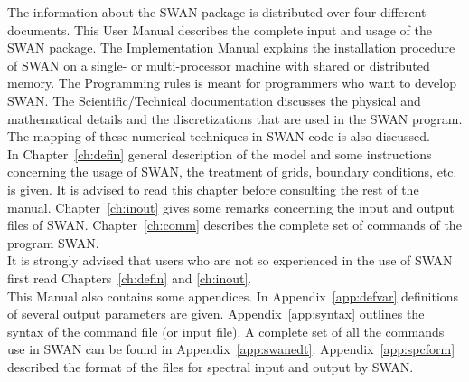 \documentclass[12pt]{book}
\begin{document}
\tableofcontents

 \label{ch:intro}

The information about the SWAN package is distributed over four different documents. This User Manual describes
the complete input and usage of the SWAN package. The Implementation Manual explains the installation procedure
of SWAN on a single- or multi-processor machine with shared or distributed memory. The Programming rules is meant
for programmers who want to develop SWAN. The Scientific/Technical documentation discusses the physical and
mathematical details and the discretizations that are used in the SWAN program. The mapping of these numerical
techniques in SWAN code is also discussed.
\nocite{Impman,Progrul,Techdoc}
\\[2ex]
\noindent
In Chapter~\ref{ch:defin} general description of the model and some instructions concerning the usage of SWAN,
the treatment of grids, boundary conditions, etc. is given. It is advised to read this chapter before consulting
the rest of the manual. Chapter~\ref{ch:inout} gives some remarks concerning the input and output files of SWAN.
Chapter~\ref{ch:comm} describes the complete set of commands of the program SWAN.
\\[2ex]
\noindent
It is strongly advised that users who are not so experienced in the use of SWAN first read Chapters~\ref{ch:defin}
and \ref{ch:inout}.
\\[2ex]
\noindent
This Manual also contains some appendices. In Appendix~\ref{app:defvar} definitions of several output parameters are given.
Appendix~\ref{app:syntax} outlines the syntax of the command file (or input file). A complete set of all the commands use
in SWAN can be found in Appendix~\ref{app:swanedt}. Appendix~\ref{app:spcform} described the format of the files for
spectral input and output by SWAN.

 \label{ch:defin}
\end{document}
